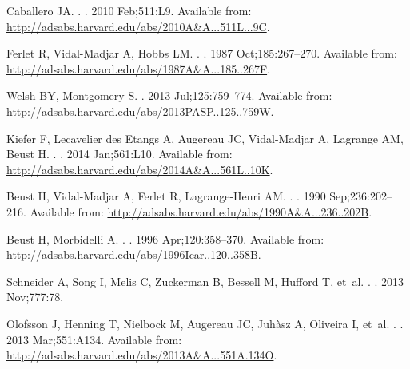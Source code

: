 \documentclass[]{rsos}
\begin{document}
\begin{thebibliography}{10}
{Caballero} JA.
.
\newblock \aap. 2010 Feb;511:L9.
\newblock Available from:
  \url{http://adsabs.harvard.edu/abs/2010A&A...511L...9C}.

{Ferlet} R, {Vidal-Madjar} A, {Hobbs} LM.
.
\newblock \aap. 1987 Oct;185:267--270.
\newblock Available from:
  \url{http://adsabs.harvard.edu/abs/1987A&A...185..267F}.

{Welsh} BY, {Montgomery} S.
\newblock \pasp. 2013 Jul;125:759--774.
\newblock Available from:
  \url{http://adsabs.harvard.edu/abs/2013PASP..125..759W}.

{Kiefer} F, {Lecavelier des Etangs} A, {Augereau} JC, {Vidal-Madjar} A,
  {Lagrange} AM, {Beust} H.
.
\newblock \aap. 2014 Jan;561:L10.
\newblock Available from:
  \url{http://adsabs.harvard.edu/abs/2014A&A...561L..10K}.

{Beust} H, {Vidal-Madjar} A, {Ferlet} R, {Lagrange-Henri} AM.
.
\newblock \aap. 1990 Sep;236:202--216.
\newblock Available from:
  \url{http://adsabs.harvard.edu/abs/1990A&A...236..202B}.

{Beust} H, {Morbidelli} A.
.
\newblock \icarus. 1996 Apr;120:358--370.
\newblock Available from:
  \url{http://adsabs.harvard.edu/abs/1996Icar..120..358B}.

{Schneider} A, {Song} I, {Melis} C, {Zuckerman} B, {Bessell} M, {Hufford} T,
  et~al.
.
\newblock \apj. 2013 Nov;777:78.

{Olofsson} J, {Henning} T, {Nielbock} M, {Augereau} JC, {Juh{\`a}sz} A,
  {Oliveira} I, et~al.
.
\newblock \aap. 2013 Mar;551:A134.
\newblock Available from:
  \url{http://adsabs.harvard.edu/abs/2013A&A...551A.134O}.


\end{thebibliography}
\end{document}
